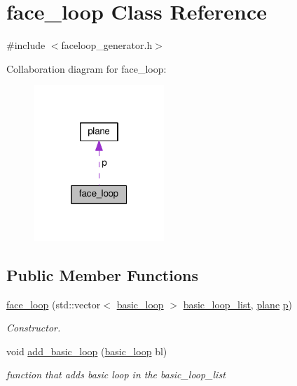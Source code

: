 \hypertarget{classface__loop}{}\section{face\+\_\+loop Class Reference}
\label{classface__loop}


{\ttfamily \#include $<$faceloop\+\_\+generator.\+h$>$}



Collaboration diagram for face\+\_\+loop\+:
\nopagebreak
\begin{figure}[H]
\begin{center}
\leavevmode
\includegraphics[width=139pt]{classface__loop__coll__graph}
\end{center}
\end{figure}
\subsection*{Public Member Functions}
\begin{DoxyCompactItemize}
\item 
\hyperlink{classface__loop_ad4fd127145cf380521f434dbc0d80828}{face\+\_\+loop} (std\+::vector$<$ \hyperlink{classbasic__loop}{basic\+\_\+loop} $>$ \hyperlink{classface__loop_a9eac12e0b3a21cd0dd5a6be0ad4f21c9}{basic\+\_\+loop\+\_\+list}, \hyperlink{classplane}{plane} \hyperlink{classface__loop_af184ff126eded4239b95693a8048c725}{p})
\begin{DoxyCompactList}\small\item\em Constructor. \end{DoxyCompactList}\item 
void \hyperlink{classface__loop_a52dba7a417fc35be60db0b120004c499}{add\+\_\+basic\+\_\+loop} (\hyperlink{classbasic__loop}{basic\+\_\+loop} bl)
\begin{DoxyCompactList}\small\item\em function that adds basic loop in the basic\+\_\+loop\+\_\+list \end{DoxyCompactList}\end{DoxyCompactItemize}
